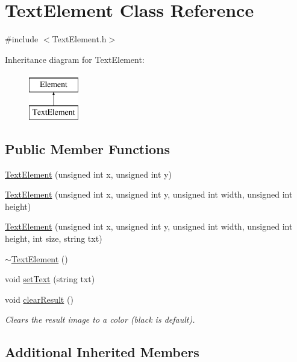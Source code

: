 \hypertarget{class_text_element}{\section{Text\-Element Class Reference}
\label{class_text_element}
}


{\ttfamily \#include $<$Text\-Element.\-h$>$}

Inheritance diagram for Text\-Element\-:\begin{figure}[H]
\begin{center}
\leavevmode
\includegraphics[height=2.000000cm]{class_text_element}
\end{center}
\end{figure}
\subsection*{Public Member Functions}
\begin{DoxyCompactItemize}
\item 
\hyperlink{class_text_element_aec15920e1f8e03bdd865ff3f6e0c396d}{Text\-Element} (unsigned int x, unsigned int y)
\item 
\hyperlink{class_text_element_ace1dec06df5c4a0635a4784b56a52b33}{Text\-Element} (unsigned int x, unsigned int y, unsigned int width, unsigned int height)
\item 
\hyperlink{class_text_element_a288497cfc1863148bfc6ed9d8450f96b}{Text\-Element} (unsigned int x, unsigned int y, unsigned int width, unsigned int height, int size, string txt)
\item 
\hyperlink{class_text_element_a8638bd2628b9a0815bae74a8baf73c1f}{$\sim$\-Text\-Element} ()
\item 
void \hyperlink{class_text_element_a5f6f8013ecd934bd628ecaf6361bf03a}{set\-Text} (string txt)
\item 
void \hyperlink{class_text_element_a2d61f3953226d9d4d06d4003d6c33c34}{clear\-Result} ()
\begin{DoxyCompactList}\small\item\em Clears the result image to a color (black is default). \end{DoxyCompactList}\end{DoxyCompactItemize}
\subsection*{Additional Inherited Members}


